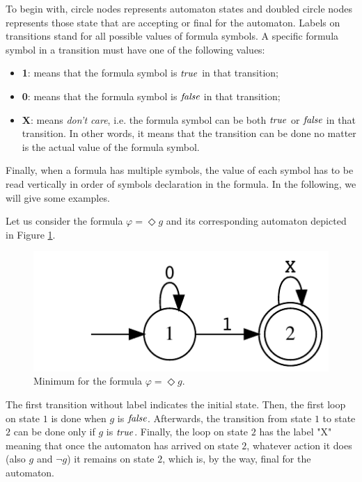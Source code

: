 To begin with, circle nodes represents automaton states and doubled circle nodes represents those state that are accepting or final for the automaton. Labels on transitions stand for all possible values of formula symbols. A specific formula symbol in a transition must have one of the following values:
\begin{itemize}
\item \textbf{1}: means that the formula symbol is $\mathit{true}$ in that transition;
\item \textbf{0}: means that the formula symbol is $\mathit{false}$ in that transition;
\item \textbf{X}: means \textit{don't care}, i.e. the formula symbol can be both $\mathit{true}$ or $\mathit{false}$ in that transition. In other words, it means that the transition can be done no matter is the actual value of the formula symbol.
\end{itemize}

Finally, when a formula has multiple symbols, the value of each symbol has to be read vertically in order of symbols declaration in the formula. In the following, we will give some examples.

\begin{example}
Let us consider the formula $\varphi = \Diamond g$ and its corresponding automaton depicted in Figure \ref{fig:automa-example1}.
\begin{figure}[h]
\centering
\includegraphics{images/example1-output.eps}
\caption{Minimum \DFA for the formula $\varphi = \Diamond g$.} 
\label{fig:automa-example1}
\end{figure}
The first transition without label indicates the initial state. Then, the first loop on state $1$ is done when $g$ is $\mathit{false}$. Afterwards, the transition from state $1$ to state $2$ can be done only if $g$ is $\mathit{true}$. Finally, the loop on state $2$ has the label "X" meaning that once the automaton has arrived on state $2$, whatever action it does (also $g$ and $\lnot g$) it remains on state $2$, which is, by the way, final for the automaton.
\end{example}

